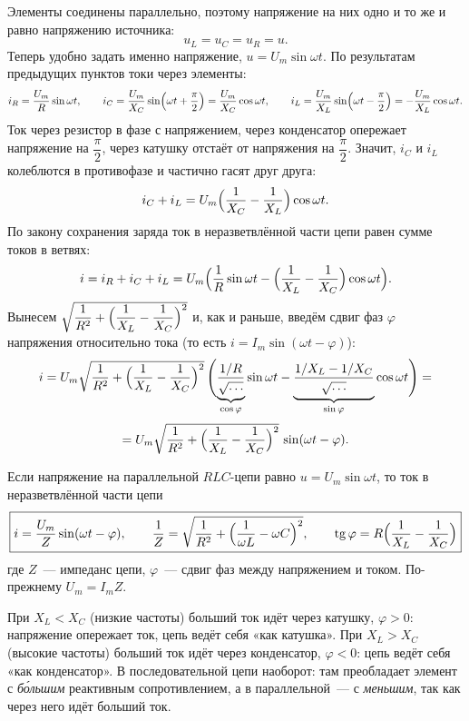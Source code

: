 \documentclass[12pt]{article}
\begin{document}
	Элементы соединены параллельно, поэтому напряжение на них одно и то же и равно напряжению источника:
	\[
		u_L = u_C = u_R = u.
	\]
	Теперь удобно задать именно напряжение, $u = U_m \sin \omega t$. По результатам предыдущих пунктов токи через элементы:
	\[
		i_R = \dfrac{U_m}{R} \sin \omega t, \qquad i_C = \dfrac{U_m}{X_C} \sin \Bigl( \omega t + \dfrac{\pi}{2} \Bigr) = \dfrac{U_m}{X_C} \cos \omega t, \qquad i_L = \dfrac{U_m}{X_L} \sin \Bigl( \omega t - \dfrac{\pi}{2} \Bigr) = -\dfrac{U_m}{X_L} \cos \omega t.
	\]
	Ток через резистор в фазе с напряжением, через конденсатор опережает напряжение на $\dfrac{\pi}{2}$, через катушку отстаёт от напряжения на $\dfrac{\pi}{2}$. Значит, $i_C$ и $i_L$ колеблются в противофазе и частично гасят друг друга:
	\[
		i_C + i_L = U_m \Bigl( \dfrac{1}{X_C} - \dfrac{1}{X_L} \Bigr) \cos \omega t.
	\]
	По закону сохранения заряда ток в неразветвлённой части цепи равен сумме токов в ветвях:
	\[
		i = i_R + i_C + i_L = U_m \Bigl( \dfrac{1}{R} \sin \omega t - \Bigl( \dfrac{1}{X_L} - \dfrac{1}{X_C} \Bigr) \cos \omega t \Bigr).
	\]
	Вынесем $\sqrt{\dfrac{1}{R^2} + \Bigl( \dfrac{1}{X_L} - \dfrac{1}{X_C} \Bigr)^2}$ и, как и раньше, введём сдвиг фаз $\varphi$ напряжения относительно тока (то есть $i = I_m \sin (\omega t - \varphi)$):
	\[
		i = U_m \sqrt{\dfrac{1}{R^2} + \Bigl( \dfrac{1}{X_L} - \dfrac{1}{X_C} \Bigr)^2} \, \Biggl( \underbrace{\dfrac{1/R}{\sqrt{\dots}}}_{\cos \varphi} \sin \omega t - \underbrace{\dfrac{1/X_L - 1/X_C}{\sqrt{\dots}}}_{\sin \varphi} \cos \omega t \Biggr) =
	\]
	\[
		= U_m \sqrt{\dfrac{1}{R^2} + \Bigl( \dfrac{1}{X_L} - \dfrac{1}{X_C} \Bigr)^2} \, \sin (\omega t - \varphi).
	\]
	
	\begin{statement}
		Если напряжение на параллельной $RLC$-цепи равно $u = U_m \sin \omega t$, то ток в неразветвлённой части цепи
		\[
			\boxed{i = \dfrac{U_m}{Z} \sin (\omega t - \varphi), \qquad \dfrac{1}{Z} = \sqrt{\dfrac{1}{R^2} + \Bigl( \dfrac{1}{\omega L} - \omega C \Bigr)^2}, \qquad \operatorname{tg} \varphi = R \Bigl( \dfrac{1}{X_L} - \dfrac{1}{X_C} \Bigr)}
		\]
		где $Z$~--- импеданс цепи, $\varphi$~--- сдвиг фаз между напряжением и током. По-прежнему $U_m = I_m Z$.
	\end{statement}
	
	\begin{note}
		При $X_L < X_C$ (низкие частоты) больший ток идёт через катушку, $\varphi > 0$: напряжение опережает ток, цепь ведёт себя «как катушка». При $X_L > X_C$ (высокие частоты) больший ток идёт через конденсатор, $\varphi < 0$: цепь ведёт себя «как конденсатор». В последовательной цепи наоборот: там преобладает элемент с \emph{б\'{о}льшим} реактивным сопротивлением, а в параллельной~--- с \emph{меньшим}, так как через него идёт больший ток.
	\end{note}
	
\end{document}

